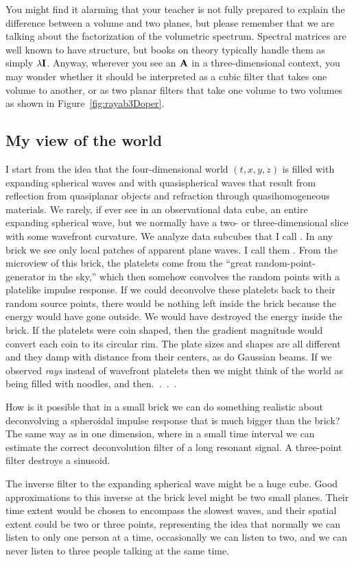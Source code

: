 \par
You might find it alarming
that your teacher is not fully prepared
to explain the difference between a volume and two planes,
but please remember that we are talking about
the factorization of the volumetric spectrum.
Spectral matrices are well known to have structure,
but books on theory typically handle them as simply $\lambda \bold I$.
Anyway, wherever you see an $\bold A$ in a three-dimensional context,
you may wonder whether it should be interpreted as a cubic filter
that takes one volume to another,
or as two planar filters
that take one volume to two volumes
as shown in Figure~\ref{fig:rayab3Doper}.

\subsection{My view of the world}
\par
I start from the idea that the four-dimensional world $(t,x,y,z)$
is filled with expanding spherical waves and with quasispherical waves
that result from reflection from quasiplanar objects
and refraction through quasihomogeneous materials.
We rarely, if ever see
in an observational data cube,
an entire expanding spherical wave,
but we normally have a two- or three-dimensional slice
with some wavefront curvature.
We analyze data subcubes that I call .
In any brick we see only local patches of apparent plane waves.
I call them .
From the microview of this brick,
the platelets come from the ``great random-point-generator in the sky,''
which then somehow convolves the random points
with a platelike impulse response.
If we could deconvolve these platelets back to their random source points,
there would be nothing left inside the brick
because the energy would have gone outside.
We would have destroyed the energy inside the brick.
If the platelets were coin shaped,
then the gradient magnitude would convert each coin to its circular rim.
The plate sizes and shapes are all different
and they damp with distance from their centers, as do Gaussian beams.
If we observed {\it rays} instead of wavefront platelets
then we might think of the world as being filled with noodles,
and then.\ .\ .\ .
\par
How is it possible that in a small brick we can do something realistic
about deconvolving a spheroidal impulse response
that is much bigger than the brick?
The same way as in one dimension,
where
in a small time interval we can estimate the correct deconvolution filter
of a long resonant signal.
A three-point filter destroys a sinusoid.
\par
The inverse filter to the expanding spherical wave might be a huge cube.
Good approximations to this inverse at the brick level
might be two small planes.
Their time extent would be chosen to encompass the slowest waves,
and their spatial extent could be two or three points,
representing
the idea that normally we can listen to only one person at a time,
occasionally we can listen to two,
and we can never listen to three people talking at the same time.

